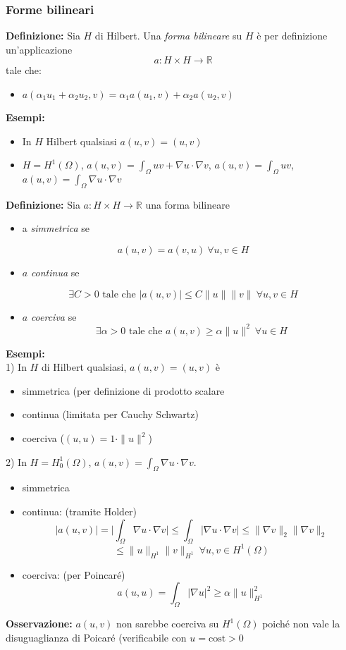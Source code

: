 \documentclass[a4paper]{article}
\newcommand{\R}{\mathbb{R}}
\begin{document}
\subsubsection{Forme bilineari}
\begin{tcolorbox}
\textbf{Definizione: }Sia $H$ di Hilbert. Una \emph{forma bilineare} su $H$ è per definizione un'applicazione 
\[a:H\times H\to \R\]
tale che:
\begin{itemize}
	\item $a(\alpha_1u_1+\alpha_2u_2,v)=\alpha_1a(u_1,v)+\alpha_2a(u_2,v)$
\end{itemize}
\end{tcolorbox}
\textbf{Esempi:} 
\begin{itemize}
	\item In $H$ Hilbert qualsiasi $a(u,v)=(u,v)$ 
	\item $H=H^1(\Omega)$, $a(u,v)=\int_{\Omega}^{} uv+\nabla u\cdot \nabla v $, $a(u,v)=\int_{\Omega}^{} uv $, $a(u,v)=\int_{\Omega}^{}  \nabla u\cdot \nabla v$

\end{itemize}
\begin{tcolorbox}
\textbf{Definizione: }Sia $a:H\times H\to \R$ una forma bilineare
\begin{itemize}
	\item a \emph{simmetrica} se
\end{itemize}
\[a(u,v)=a(v,u)\ \forall u,v\in H\]
\begin{itemize}
	\item $a$ \emph{continua} se
\end{itemize}
\[\exists C>0 \text{ tale che }|a(u,v)|\le C\|u\|\|v\|\ \forall u,v\in H\]
\begin{itemize}
\item $a$ \emph{coerciva} se 
	\[\exists \alpha>0\text{ tale che }a(u,v)\ge \alpha \|u\|^2\ \forall u\in H\]
\end{itemize}

\end{tcolorbox}
\textbf{Esempi:} 
\\1) In $H$ di Hilbert qualsiasi, $a(u,v)=(u,v)$ è
\begin{itemize}
	\item simmetrica (per definizione di prodotto scalare
	\item continua (limitata per Cauchy Schwartz)
	\item coerciva ($(u,u)=1\cdot \|u\|^2$)
\end{itemize}
2) In $H=H_0^1(\Omega)$, $a(u,v)=\int_{\Omega}^{} \nabla u\cdot \nabla v $.
\begin{itemize}
	\item simmetrica
	\item continua: (tramite Holder)
		\[|a(u,v)|=\bigg|\int_{\Omega}^{} \nabla u\cdot \nabla v\bigg|\le \int_{\Omega}^{} |\nabla u\cdot \nabla v|\le \|\nabla v\|_2\|\nabla v\|_2\]
		\[\le \|u\|_{H^1}\|v\|_{H^1}\ \forall u,v\in H^1(\Omega)\]
	\item coerciva: (per Poincaré)
		\[a(u,u)=\int_{\Omega}^{} |\nabla u|^2\ge \alpha \|u\|^2_{H^1}\] 
\end{itemize}
\textbf{Osservazione:} $a(u,v)$ non sarebbe coerciva su $H^1(\Omega)$ poiché non vale la disuguaglianza di Poicaré (verificabile con $u=\text{cost}> 0$ 
\end{document}
